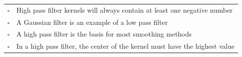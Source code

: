 \begin{enumerate}[(a)]
\begin{tabular}[h]{ll}
$\square$ & High pass filter kernels will always contain at least one negative number \\
$\square$ & A Gaussian filter is an example of a low pass filter \\
$\square$ & A high pass filter is the basis for most smoothing methods \\
$\square$ & In a high pass filter, the center of the kernel must have the highest value \\
\end{tabular}

\end{enumerate}




\pagebreak
